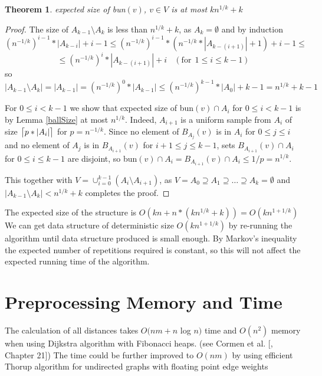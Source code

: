 \documentclass[shortabstract, lic, english]{iithesis}
\theoremstyle{definition} \newtheorem{definition}{Definition}[chapter]
\theoremstyle{remark} \newtheorem{remark}[definition]{Observation}
\theoremstyle{plain} \newtheorem{theorem}[definition]{Theorem}
\theoremstyle{plain} \newtheorem{lemma}[definition]{Lemma}
\theoremstyle{plain} \newtheorem{conjecture}[definition]{Conjecture}
\DeclarePairedDelimiter{\ceil}{\lceil}{\rceil}
\begin{document}
\begin{theorem}
    expected size of bun$(v)$, $v \in V$ is at most $kn^{1/k} + k$
\end{theorem}
\begin{proof}
    The size of $A_{k-1} \setminus A_k$ is less than $n^{1/k} + k$, as $A_k = \emptyset$ and by induction
    $$(n^{-1/k})^{i-1} * |A_{k-i}| + i - 1 \leq (n^{-1/k})^{i-1} * (n^{-1/k} * |A_{k-(i+1)}| + 1) + i - 1 \leq$$ 
    $$\leq (n^{-1/k})^{i} * |A_{k-(i+1)}| + i~~~~(\text{for}~~1 \leq i \leq k-1)$$
    so $|A_{k-1} \setminus A_k| = |A_{k-1}| = (n^{-1/k})^0 * |A_{k-1}| \leq (n^{-1/k})^{k-1} * |A_{0}| + k - 1 = n^{1/k} + k - 1$
    
    For $0 \leq i < k-1$ we show that expected size of bun$(v) \cap A_i$ for $0 \leq i < k-1$ is by Lemma \ref{ballSize}
    at most $n^{1/k}$. Indeed, $A_{i+1}$ is a uniform sample from $A_i$ of size $\ceil[\big]{p * |A_i|}$ for $p = n^{-1/k}$.
    Since no element of $B_{A_j}(v)$ is in $A_i$ for $0 \leq j \leq i$ and
    no element of $A_{j}$ is in $B_{A_{i+1}}(v)$ for $i+1 \leq j \leq k-1$, sets $B_{A_{i+1}}(v) \cap A_i$ for $0 \leq i \leq k-1$ are disjoint, so
    bun$(v) \cap A_i = B_{A_{i+1}}(v) \cap A_i \leq 1/p = n^{1/k}$.
    
    This together with $V = \cup_{i=0}^{k-1} (A_i \setminus A_{i+1})$, as $V = A_0 \supseteq A_1 \supseteq \ldots \supseteq A_k = \emptyset$
    and $|A_{k-1} \setminus A_k| < n^{1/k} + k$ completes the proof.
\end{proof}

The expected size of the structure is $O(kn + n*(kn^{1/k}+k)) = O(kn^{1 + 1/k})$
We can get data structure of deterministic size $O(kn^{1 + 1/k})$ by re-running the algorithm
until data structure produced is small enough.
By Markov's inequality the expected number of repetitions required is constant, so this will not
affect the expected running time of the algorithm.

\section{Preprocessing Memory and Time}

The calculation of all distances takes $O(nm + n $ log $n)$ time and $O(n^2)$ memory
when using Dijkstra algorithm with Fibonacci heaps. (see Cormen et al. [\cite{cormen}, Chapter 21])
The time could be further improved to $O(nm)$ by using efficient Thorup algorithm for undirected graphs with floating point edge weights\cite{uberDijkstraInt}\cite{uberDijkstraFloat}
\end{document}

